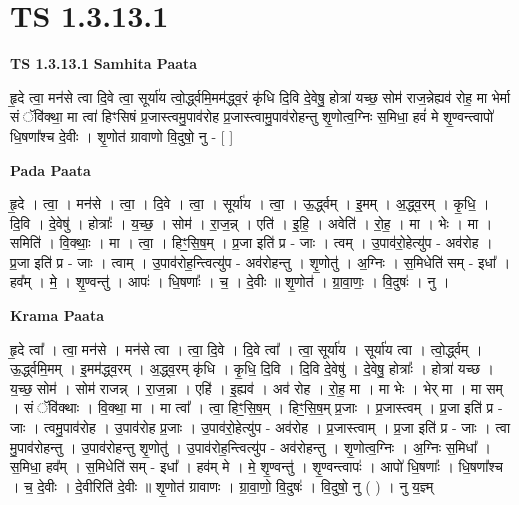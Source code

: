 \documentclass[17pt]{extarticle}
\begin{document}
\section*{ TS 1.3.13.1 }

\textbf{TS 1.3.13.1 } \newline
\textbf{Samhita Paata} \newline

हृ॒दे त्वा॒ मन॑से त्वा दि॒वे त्वा॒ सूर्या॑य त्वो॒र्द्ध्वमि॒मम॑द्ध्व॒रं कृ॑धि दि॒वि दे॒वेषु॒ होत्रा॑ यच्छ॒ सोम॑ राज॒न्नेह्यव॑ रोह॒ मा भेर्मा सं ॅवि॑क्था॒ मा त्वा॑ हिꣳसिषं प्र॒जास्त्वमु॒पाव॑रोह प्र॒जास्त्वामु॒पाव॑रोहन्तु शृ॒णोत्व॒ग्निः स॒मिधा॒ हवं॑ मे शृ॒ण्वन्त्वापो॑ धि॒षणा᳚श्च दे॒वीः । शृ॒णोत॑ ग्रावाणो वि॒दुषो॒ नु - [ ] \newline

\textbf{Pada Paata} \newline

हृ॒दे । त्वा॒ । मन॑से । त्वा॒ । दि॒वे । त्वा॒ । सूर्या॑य । त्वा॒ । ऊ॒र्द्ध्वम् । इ॒मम् । अ॒द्ध्व॒रम् । कृ॒धि॒ । दि॒वि । दे॒वेषु॑ । होत्राः᳚ । य॒च्छ॒ । सोम॑ । रा॒ज॒न्न् । एति॑ । इ॒हि॒ । अवेति॑ । रो॒ह॒ । मा । भेः । मा । समिति॑ । वि॒क्थाः॒ । मा । त्वा॒ । हिꣳ॒॒सि॒ष॒म् । प्र॒जा इति॑ प्र - जाः । त्वम् । उ॒पाव॑रो॒हेत्यु॑प - अव॑रोह । प्र॒जा इति॑ प्र - जाः । त्वाम् । उ॒पाव॑रोह॒न्त्वित्यु॑प - अव॑रोहन्तु । शृ॒णोतु॑ । अ॒ग्निः । स॒मिधेति॑ सम् - इधा᳚ । हव᳚म् । मे॒ । शृ॒ण्वन्तु॑ । आपः॑ । धि॒षणाः᳚ । च॒ । दे॒वीः ॥ शृ॒णोत॑ । ग्रा॒वा॒णः॒ । वि॒दुषः॑ । नु ।  \newline


\textbf{Krama Paata} \newline

हृ॒दे त्वा᳚ । त्वा॒ मन॑से । मन॑से त्वा । त्वा॒ दि॒वे । दि॒वे त्वा᳚ । त्वा॒ सूर्या॑य । सूर्या॑य त्वा । त्वो॒र्द्ध्वम् । ऊ॒र्द्ध्वमि॒मम् । इ॒मम॑द्ध्व॒रम् । अ॒द्ध्व॒रम् कृ॑धि । कृ॒धि॒ दि॒वि । दि॒वि दे॒वेषु॑ । दे॒वेषु॒ होत्राः᳚ । होत्रा॑ यच्छ । य॒च्छ॒ सोम॑ । सोम॑ राजन्न् । रा॒ज॒न्ना । एहि॑ । इ॒ह्यव॑ । अव॑ रोह । रो॒ह॒ मा । मा भेः । भेर् मा । मा सम् । सं ॅवि॑क्थाः । वि॒क्था॒ मा । मा त्वा᳚ । त्वा॒ हिꣳ॒॒सि॒ष॒म् । हिꣳ॒॒सि॒ष॒म् प्र॒जाः । प्र॒जास्त्वम् । प्र॒जा इति॑ प्र - जाः । त्वमु॒पाव॑रोह । उ॒पाव॑रोह प्र॒जाः । उ॒पाव॑रो॒हेत्यु॑प - अव॑रोह । प्र॒जास्त्वाम् । प्र॒जा इति॑ प्र - जाः । त्वा मु॒पाव॑रोहन्तु । उ॒पाव॑रोहन्तु शृ॒णोतु॑ । उ॒पाव॑रोह॒न्त्वित्यु॑प - अव॑रोहन्तु । शृ॒णोत्व॒ग्निः । अ॒ग्निः स॒मिधा᳚ । स॒मिधा॒ हव᳚म् । स॒मिधेति॑ सम् - इधा᳚ । हव॑म् मे । मे॒ शृ॒ण्वन्तु॑ । शृ॒ण्वन्त्वापः॑ । आपो॑ धि॒षणाः᳚ । धि॒षणा᳚श्च । च॒ दे॒वीः । दे॒वीरिति॑ दे॒वीः ॥ शृ॒णोत॑ ग्रावाणः । ग्रा॒वा॒णो॒ वि॒दुषः॑ । वि॒दुषो॒ नु ( ) । नु य॒ज्ञ्म् \newline
\end{document}
